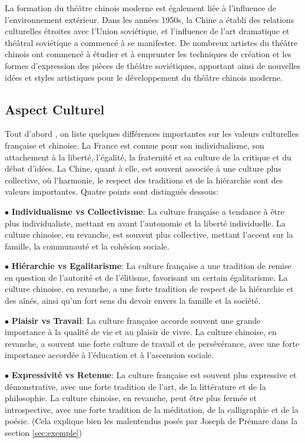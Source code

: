 \documentclass[UTF8,a4paper,12pt]{ctexart}
\numberwithin{equation}{section}
\newcommand{\mycite}[1]{\cite{#1}}
\begin{document}
La formation du théâtre chinois moderne est également liée à l'influence de l'environnement extérieur. Dans les années 1950s, la Chine a établi des relations culturelles étroites avec l'Union soviétique, et l'influence de l'art dramatique et théâtral soviétique a commencé à se manifester. De nombreux artistes du théâtre chinois ont commencé à étudier et à emprunter les techniques de création et les formes d'expression des pièces de théâtre soviétiques, apportant ainsi de nouvelles idées et styles artistiques pour le développement du théâtre chinois moderne.


\subsection{Aspect Culturel}
Tout d'abord , on liste quelques différences importantes sur les valeurs culturelles française et chinoise. La France est connue pour son individualisme, son attachement à la liberté, l'égalité, la fraternité et sa culture de la critique et du débat d'idées. La Chine, quant à elle, est souvent associée à une culture plus collective, où l'harmonie, le respect des traditions et de la hiérarchie sont des valeurs importantes. Quatre points sont distingués dessous\mycite{19}:

$\bullet$ \textbf{Individualisme vs Collectivisme}: La culture française a tendance à être plus individualiste, mettant en avant l'autonomie et la liberté individuelle. La culture chinoise, en revanche, est souvent plus collective, mettant l'accent sur la famille, la communauté et la cohésion sociale.

$\bullet$ \textbf{Hiérarchie vs Egalitarisme}: La culture française a une tradition de remise en question de l'autorité et de l'élitisme, favorisant un certain égalitarisme. La culture chinoise, en revanche, a une forte tradition de respect de la hiérarchie et des aînés, ainsi qu'un fort sens du devoir envers la famille et la société.

$\bullet$ \textbf{Plaisir vs Travail}: La culture française accorde souvent une grande importance à la qualité de vie et au plaisir de vivre. La culture chinoise, en revanche, a souvent une forte culture de travail et de persévérance, avec une forte importance accordée à l'éducation et à l'ascension sociale.

$\bullet$ \textbf{Expressivité vs Retenue}: La culture française est souvent plus expressive et démonstrative, avec une forte tradition de l'art, de la littérature et de la philosophie. La culture chinoise, en revanche, peut être plus fermée et introspective, avec une forte tradition de la méditation, de la calligraphie et de la poésie. (Cela explique bien les malentendus posés par Joseph de Prémare dans la section \ref{sec:exemple})
\end{document}
